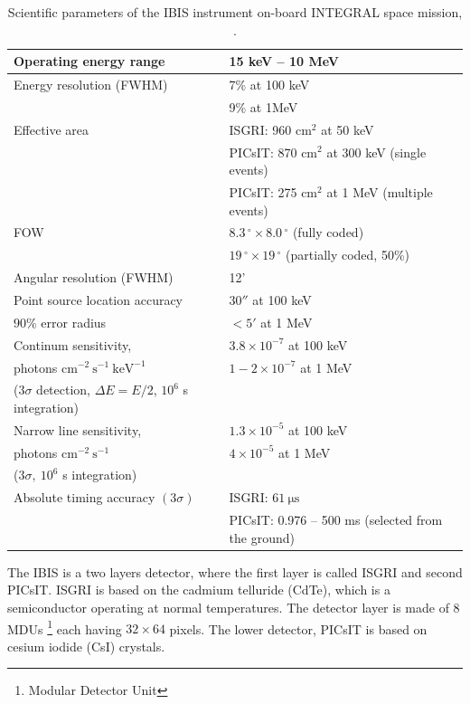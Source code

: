\documentclass[oneside,a4paper,11pt]{report}
\begin{document}
\begin{table}[hbt!]\footnotesize
\begin{center}
\caption{Scientific parameters of the IBIS instrument on-board INTEGRAL space mission, \citet{osam}.}
\begin{tabular}{|l|l|}
\hline
Operating energy range     & 15 keV -- 10 MeV\\
\hline
Energy resolution (FWHM)   & 7\% at 100 keV\\
                           & 9\% at 1MeV  \\
\hline
Effective area             & ISGRI: 960 $\mathrm{cm^2}$ at 50 keV \\
                           & PICsIT: 870 $\mathrm{cm^2}$ at 300 keV (single events)\\
                           & PICsIT: 275 $\mathrm{cm^2}$ at 1 MeV (multiple events)\\
\hline
FOW                        &$8.3\,^{\circ} \times 8.0\,^{\circ}$ (fully coded) \\
                           &$19\,^{\circ} \times 19\,^{\circ}$ (partially coded, 50\%)\\
\hline
Angular resolution (FWHM)  & 12' \\
\hline
Point source location accuracy & $30''$ at 100 keV \\
$90\%$ error radius      & $<5'$ at 1 MeV \\
\hline
Continum sensitivity, & $3.8 \times 10^{-7}$ at 100 keV \\
photons $\mathrm{cm^{-2}\: s^{-1}\: keV^{-1}}$ & $1 - 2 \times 10^{-7}$ at 1 MeV \\
($3 \sigma$ detection, $\Delta E = E/2$, $10^6$ s integration) &  \\
\hline
Narrow line sensitivity, & $1.3 \times 10^{-5}$ at 100 keV \\
photons $\mathrm{cm^{-2}\: s^{-1}}$ & $4 \times 10^{-5}$ at 1 MeV \\
($3\sigma,\:10^6$ s integration)&  \\
\hline
Absolute timing accuracy $(3 \sigma)$& ISGRI: $61 \:\mathrm{\mu s}$\\
 & PICsIT: 0.976 -- 500 ms (selected from the ground)\\
\hline
\end{tabular}
\end{center}
\end{table}

The IBIS is a two layers detector, where the first layer is called ISGRI and second PICsIT. ISGRI is based 
on the cadmium telluride (CdTe), which is a semiconductor operating at normal temperatures. The detector 
layer is made of 8 MDUs \footnote{Modular Detector Unit} each having $32\times64$ pixels. The lower 
detector, PICsIT is based on cesium iodide (CsI) crystals. 
\end{document}
